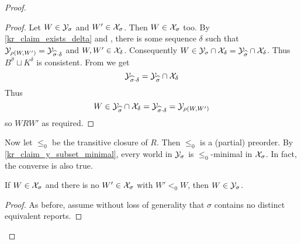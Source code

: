 \begin{proof}
\begin{proof}
        Let $W \in \mathcal{Y}_\sigma$ and $W' \in \mathcal{X}_\sigma$. Then $W \in \mathcal{X}_\sigma$
        too. By \cref{kr_claim_exists_delta} and \rearr{}, there is
        some sequence $\delta$ such that $\mathcal{Y}_{\rho(W, W')} =
        \mathcal{Y}_{\widehat{\sigma} \cdot \delta}$ and $W, W' \in \mathcal{X}_\delta$.
        Consequently $W \in \mathcal{Y}_\sigma \cap \mathcal{X}_\delta = \mathcal{Y}_{\widehat{\sigma}}
        \cap \mathcal{X}_\delta$. Thus $B^{\widehat{\sigma}} \sqcup K^\delta$ is
        consistent. From \incvac{} we get
        \[
            \mathcal{Y}_{\widehat{\sigma} \cdot \delta} = \mathcal{Y}_{\widehat{\sigma}} \cap
            \mathcal{X}_\delta
        \]
        Thus
        \[
            W \in
            \mathcal{Y}_{\widehat{\sigma}} \cap \mathcal{X}_\delta
            = \mathcal{Y}_{\widehat{\sigma} \cdot \delta}
            = \mathcal{Y}_{\rho(W, W')}
        \]
        so $W R W'$ as required.
    \end{proof}

Now let $\le_0$ be the transitive closure of $R$. Then $\le_0$ is a (partial)
preorder. By \cref{kr_claim_y_subset_minimal}, every world in $\mathcal{Y}_\sigma$ is
$\le_0$-minimal in $\mathcal{X}_\sigma$. In fact, the converse is also true.

    \begin{claim}
        \label{kr_claim_minimal_subset_y}
        If $W \in \mathcal{X}_\sigma$ and there is no $W' \in \mathcal{X}_\sigma$ with $W' <_0
        W$, then $W \in \mathcal{Y}_\sigma$.
    \end{claim}
    \begin{proof}
        As before, assume without loss of generality that
        $\sigma$ contains no distinct equivalent reports.


\end{proof}
\end{proof}
